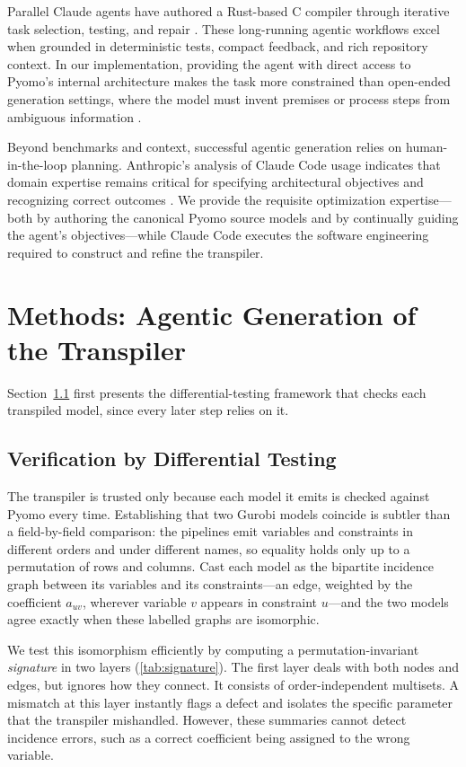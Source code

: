 \documentclass[runningheads]{llncs}
\begin{document}
Parallel Claude agents have authored a Rust-based C compiler through iterative task selection, testing, and repair \cite{carlini2026compiler}. These long-running agentic workflows excel when grounded in deterministic tests, compact feedback, and rich repository context. In our implementation, providing the agent with direct access to Pyomo's internal architecture makes the task more constrained than open-ended generation settings, where the model must invent premises or process steps from ambiguous information \cite{zahavyposition}. 

Beyond benchmarks and context, successful agentic generation relies on human-in-the-loop planning. Anthropic's analysis of Claude Code usage indicates that domain expertise remains critical for specifying architectural objectives and recognizing correct outcomes \cite{anthropic2026expertise}. We provide the requisite optimization expertise—both by authoring the canonical Pyomo source models and by continually guiding the agent's objectives—while Claude Code executes the software engineering required to construct and refine the transpiler. 

\section{Methods: Agentic Generation of the Transpiler}
\label{sec:methods}

Section~\ref{sec:methods-verify} first presents the differential-testing framework that checks each transpiled model, since every later step relies on it.

\subsection{Verification by Differential Testing}
\label{sec:methods-verify}

The transpiler is trusted only because each model it emits is checked against Pyomo every time. Establishing that two Gurobi models coincide is subtler than a field-by-field comparison: the pipelines emit variables and constraints in different orders and under different names, so equality holds only up to a permutation of rows and columns. Cast each model as the bipartite incidence graph between its variables and its constraints---an edge, weighted by the coefficient $a_{uv}$, wherever variable $v$ appears in constraint $u$---and the two models agree exactly when these labelled graphs are isomorphic.

We test this isomorphism efficiently by computing a permutation-invariant \emph{signature} in two layers (\autoref{tab:signature}). The first layer deals with both nodes and edges, but ignores how they connect. It consists of order-independent multisets. A mismatch at this layer instantly flags a defect and isolates the specific parameter that the transpiler mishandled. However, these summaries cannot detect incidence errors, such as a correct coefficient being assigned to the wrong variable.
\end{document}
